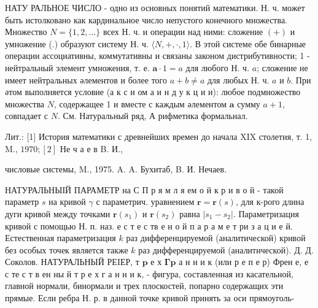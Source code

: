 \documentclass[10pt]{article}
\begin{document}
НАТУ РАЛЬНОЕ ЧИСЛО - одно из основных понятий математики. Н. ч. может быть истолковано как кардинальное число непустого конечного множества. Множество $N=\{1,2, \ldots\}$ всех Н. ч. и операции над ними: сложение $(+)$ и умножение (.) образуют систему Н. ч. $\langle N,+, \cdot, 1\rangle$. В этой системе обе бинарные операции ассоциативны, коммутативны и связаны законом дистрибутивности; 1 - нейтральный элемент умножения, т. е. $\boldsymbol{a} \cdot 1=a$ для любого Н. ч. $a$; сложение не имеет нейтральных әлементов и более того $a+b \neq a$ для любых Н. ч. $a$ и $b$. При әтом выполняется условие (а к с и ом а и н д у к ц и и): любое подмножество множества $N$, содержащее 1 и вместе с каждым әлементом $\boldsymbol{a}$ сумму $a+1$, совпадает с $N$. См. Натуральный ряд, А рифметика формальнал.



Лит.: [1] История математики с древнейших времен до начала XIX столетия, т. 1, M., $1970 ;[2]$ Не ч а е в B. И.,

числовые системы, M., 1975. A. A. Бухитаб, B. И. Нечаев.



НАТУРАЛЬНЫІЙ ПАРАМЕТР на С П р я м л я ем о й к р и в о й - такой параметр $s$ на кривой $\gamma$ с параметрич. уравнением $\boldsymbol{r}=\boldsymbol{r}(s)$, для к-рого длина дуги кривой между точками $\boldsymbol{r}\left(s_{1}\right)$ и $\boldsymbol{r}\left(s_{2}\right)$ равна $\left|s_{1}-s_{2}\right|$. Параметризация кривой с помощью Н. п. наз. е с т е с тв е н о й п а р а м е т ри з а ц и е й. Естественная параметризация $k$ раз дифференцируемой (аналитической) кривой без особых точек является также $k$ раз дифференцируемой (аналитической). Д. Д. Соколов. НАТУРАЛЬНЫЙ РЕIЕР, т $\mathbf{p}$ е х $\boldsymbol{\Gamma} \mathbf{p}$ а н н и к (или р е п е р) Френ е, е с те с т в ен ны й т р е х г а н н и к, - фигура, составленная из касательной, главной нормали, бинормали и трех плоскостей, попарно содержащих эти прямые. Если ребра Н. р. в данной точке кривой принять за оси прямоуголь-
\end{document}
